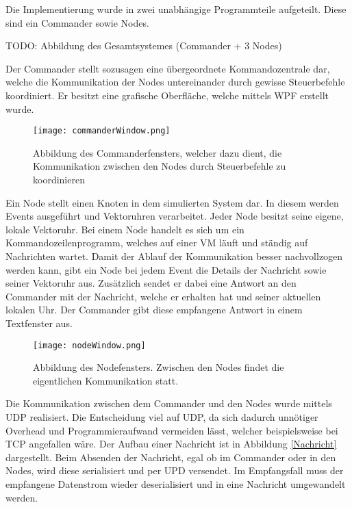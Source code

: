 Die Implementierung wurde in zwei unabhängige Programmteile aufgeteilt. Diese sind ein Commander sowie Nodes. 

TODO: Abbildung des Gesamtsystemes (Commander + 3 Nodes)

Der Commander stellt sozusagen eine übergeordnete Kommandozentrale dar, welche die Kommunikation der Nodes untereinander durch gewisse Steuerbefehle koordiniert. Er besitzt eine grafische Oberfläche, welche mittels WPF erstellt wurde.

\begin{figure}[ht]
	\centering
	\texttt{[image: commanderWindow.png]}
	\caption[Commander Window]{Abbildung des Commanderfensters, welcher dazu dient, die Kommunikation zwischen den Nodes durch Steuerbefehle zu koordinieren}
	\label{figure:commanderWindow}
\end{figure}
\FloatBarrier

Ein Node stellt einen Knoten in dem simulierten System dar. In diesem werden Events ausgeführt und Vektoruhren verarbeitet. Jeder Node besitzt seine eigene, lokale Vektoruhr. Bei einem Node handelt es sich um ein Kommandozeilenprogramm, welches auf einer VM läuft und ständig auf Nachrichten wartet. Damit der Ablauf der Kommunikation besser nachvollzogen werden kann, gibt ein Node bei jedem Event die Details der Nachricht sowie seiner Vektoruhr aus. Zusätzlich sendet er dabei eine Antwort an den Commander mit der Nachricht, welche er erhalten hat und seiner aktuellen lokalen Uhr. Der Commander gibt diese empfangene Antwort in einem Textfenster aus.

\begin{figure}[ht]
	\centering
	\texttt{[image: nodeWindow.png]}
	\caption[Node Window]{Abbildung des Nodefensters. Zwischen den Nodes findet die eigentlichen Kommunikation statt.}
\label{figure:nodeWindow}
\end{figure}
\FloatBarrier

Die Kommunikation zwischen dem Commander und den Nodes wurde mittels UDP realisiert. Die Entscheidung viel auf UDP, da sich dadurch unnötiger Overhead und Programmieraufwand vermeiden lässt, welcher beispielsweise bei TCP angefallen wäre. Der Aufbau einer Nachricht ist in Abbildung \ref{Nachricht} dargestellt. Beim Absenden der Nachricht, egal ob im Commander oder in den Nodes, wird diese serialisiert und per UPD versendet. Im Empfangsfall muss der empfangene Datenstrom wieder deserialisiert und in eine Nachricht umgewandelt werden. 
